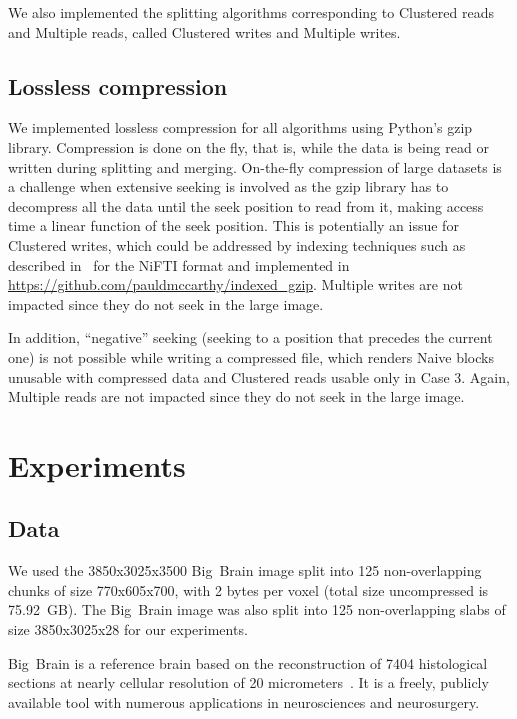 \documentclass[10pt, conference, compsocconf]{IEEEtran}
\begin{document}
We also implemented the splitting algorithms corresponding to
Clustered reads and Multiple reads, called Clustered writes and
Multiple writes.

\subsection{Lossless compression}

We implemented lossless compression for all algorithms using Python's
gzip library. Compression is done on the fly, that is, while the data
is being read or written during splitting and merging. 
On-the-fly compression of large datasets is
a challenge when extensive seeking is involved as the gzip library has
to decompress all the data until the seek position to read from it,
making access time a linear function of the seek position. This is
potentially an issue for Clustered writes, which could be addressed by
indexing techniques such as described in~\cite{rajna2015speeding} for
the NiFTI format and implemented in
\url{https://github.com/pauldmccarthy/indexed\_gzip}. Multiple writes
are not impacted since they do not seek in the large image.

In addition, ``negative'' seeking (seeking to a position that precedes
the current one) is not possible while writing a compressed file,
which renders Naive blocks unusable with compressed data and Clustered
reads usable only in Case 3.  Again, Multiple reads are not impacted
since they do not seek in the large image.

\section{Experiments}
\label{sec:experiments}

\subsection{Data}
We used the 3850x3025x3500 Big~Brain image split into 125
non-overlapping chunks of size 770x605x700, with 2 bytes per voxel
(total size uncompressed is 75.92~GB). The Big~Brain image was also split
into 125 non-overlapping slabs of size 3850x3025x28 for our experiments.

Big~Brain is a reference brain
based on the reconstruction of 7404 histological sections at nearly
cellular resolution of 20 micrometers~\cite{amunts2013bigbrain}. It is
a freely, publicly available tool with numerous applications in
neurosciences and neurosurgery.
\end{document}
